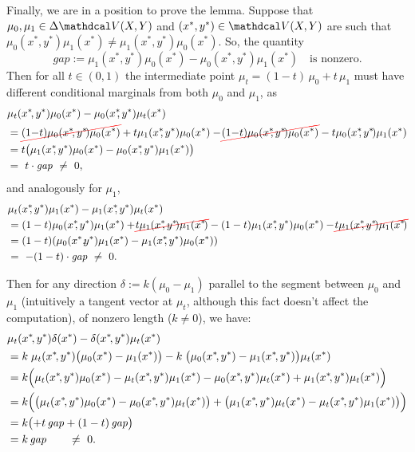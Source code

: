 \begin{subappendices}
\begin{lproof}
    Finally, we are in a position to prove the lemma.
    Suppose that $\mu_0,\mu_1 \in \Delta\V(X,Y)$ and $(x^*,y^*) \in \V(X,Y)$
    are such that $\mu_0(x^*,y^*) \mu_1(x^*)  \ne \mu_1(x^*,y^*) \mu_0(x^*)$.
    So, the quantity
    \[
        \mathit{gap} := \mu_1(x^*,y^*) \mu_0(x^*) - \mu_0(x^*,y^*) \mu_1(x^*)
        \quad\text{is nonzero}.
    \]
    Then for all $t \in (0,1)$ the intermediate point $\mu_t = (1-t)\, \mu_0 + t\, \mu_1$ must have different conditional marginals from both $\mu_0$ and $\mu_1$, as
    \begin{align*}
        &\mu_t(x^*\!,y^*)\mu_0(x^*) - \mu_0(x^*\!\!,y^*) \mu_t(x^*) \\
            &= \Cancel[red]{(1{-}t)\mu_0(x^*\!,y^*\!)\mu_0(x^*)} + t \mu_1(x^*\!\!,y^*)\mu_0(x^*)
                - \!\Cancel[red]{(1{-}t)\mu_0(x^*\!\!,y^*\!) \mu_0(x^*)} - t\mu_0(x^*\!\!,y^*\!) \mu_1(x^*) \\
            &= t \pqty[\big] { \mu_1(x^*\!\!,y^*)\mu_0(x^*) -\mu_0(x^*\!\!,y^*) \mu_1(x^*)}
            \\
            &=~ t \cdot \mathit{gap}
            ~\ne~ 0,
    \end{align*}
    and analogously for $\mu_1$,
    \begin{align*}
        &\mu_t(x^*\!\!,y^*)\mu_1(x^*) - \mu_1(x^*\!\!,y^*) \mu_t(x^*) \\
            &= (1-t)\mu_0(x^*\!\!,y^*)\mu_1(x^*) + \!\Cancel[red]{t \mu_1(x^*\!\!,y^*\!)\mu_1(x^*\!) }
                -  (1-t)\mu_1(x^*\!\!,y^*) \mu_0(x^*) - \!\Cancel[red]{t\mu_1(x^*\!\!,y^*\!) \mu_1(x^*\!) } \\
            &= (1-t) (\mu_0(x^*,\!\!y^*)\mu_1(x^*) -\mu_1(x^*\!\!,y^*) \mu_0(x^*))
            \\
            &=~ -(1-t) \cdot \mathit{gap}
            ~\ne~ 0.
    \end{align*}

    Then for any direction $\delta := k(\mu_0 - \mu_1)$ parallel to the segment between $\mu_0$ and $\mu_1$ (intuitively a tangent vector at $\mu_t$, although this fact doesn't affect the computation), of nonzero length ($k\ne 0$), we have:
    \begin{align*}
        &
        \mu_t(x^*\!,y^*) \delta(x^*)  - \delta(x^*\!,y^*) \mu_t(x^*)
        \\
        &= k\; \mu_t(x^*\!,y^*) \pqty[\big]{\mu_0(x^*) - \mu_1(x^*)}  - k\; \pqty[\big]{\mu_0(x^*\!,y^*)-\mu_1(x^*\!,y^*)} \mu_t(x^*) \\
        &= k \pqty[\Big]{\mu_t(x^*\!,y^*)\mu_0(x^*) - \mu_t(x^*\!,y^*)\mu_1(x^*)
            -\mu_0(x^*\!,y^*)\mu_t(x^*) + \mu_1(x^*\!,y^*)\mu_t(x^*)} \\
        &= k \pqty[\Big]{ \pqty[\big]{ \mu_t(x^*\!,y^*)\mu_0(x^*) -\mu_0(x^*\!,y^*)\mu_t(x^*)} + \pqty[\big]{\mu_1(x^*\!,y^*)\mu_t(x^*) - \mu_t(x^*\!,y^*)\mu_1(x^*)}} \\
        &= k \pqty[\big]{ + t \,\mathit{gap} + (1-t) \,\mathit{gap}} \\
        &= k \,\mathit{gap} \qquad \ne~ 0.
    \end{align*}


\end{lproof}
\end{subappendices}
